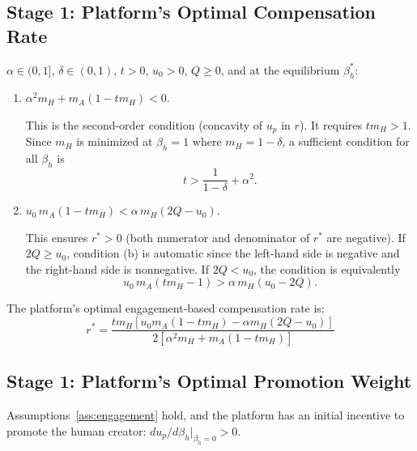 \documentclass[mnsc,nonblindrev]{informs3_NoOR}
\begin{document}
\subsection{Stage 1: Platform's Optimal Compensation Rate}
\begin{assumption}\label{ass:engagement}
$\alpha \in (0,1]$, $\delta \in (0,1)$, $t > 0$, $u_0 > 0$, $Q \ge 0$, and at the equilibrium $\beta_h^*$:
\begin{enumerate}
\item[\textup{(a)}] $\alpha^2 m_H + m_A(1 - tm_H) < 0$.
 
This is the second-order condition (concavity of $u_p$ in $r$). It requires $tm_H > 1$. Since $m_H$ is minimized at $\beta_h = 1$ where $m_H = 1-\delta$, a sufficient condition for all $\beta_h$ is
\[
t > \frac{1}{1-\delta} + \alpha^2.
\]
 
\item[\textup{(b)}] $u_0\,m_A(1 - tm_H) < \alpha\,m_H(2Q - u_0)$.
 
This ensures $r^* > 0$ (both numerator and denominator of $r^*$ are negative). If $2Q \ge u_0$, condition \textup{(b)} is automatic since the left-hand side is negative and the right-hand side is nonnegative. If $2Q < u_0$, the condition is equivalently
\[
u_0\,m_A(tm_H - 1) > \alpha\,m_H(u_0 - 2Q).
\]
\end{enumerate}
\end{assumption}

\begin{proposition}
\label{prop:r(eng)}
The platform's optimal engagement-based compensation rate is:
\begin{equation}
r^{*} = \frac{tm_{H} [ u_{0}m_{A}(1 - tm_{H}) - \alpha m_{H}(2Q - u_{0}) ]}{2 [ \alpha^{2}m_{H} + m_{A}(1 - tm_{H}) ]}
\end{equation}
\end{proposition}



\subsection{Stage 1: Platform's Optimal Promotion Weight}

\begin{assumption}\label{ass:eng-promotion}
Assumptions~\ref{ass:engagement} hold, and the platform has an initial incentive to promote the human creator: $du_p/d\beta_h\big|_{\beta_h=0} > 0$.
\end{assumption}
 
\end{document}

